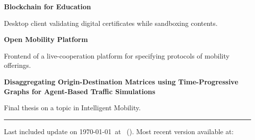 \begin{paracol}{2}
\divider


\textbf{Blockchain for Education}

Desktop client validating digital certificates while sandboxing contents.

\smallskip


\medskip

\textbf{Open Mobility Platform}

Frontend of a live-cooperation platform for specifying protocols of mobility offerings.

\smallskip

 

\smallskip


\medskip



\textbf{Disaggregating Origin-Destination Matrices
using Time-Progressive Graphs for Agent-Based Traffic Simulations}

Final thesis on a topic in Intelligent Mobility.

\smallskip

   

\smallskip





\end{paracol}

\vfill
\hrule
\medskip
\small{
    Last included update on \today~at \DTMcurrenttime~(\DTMcurrentzone).
    Most recent version available at: 
}
